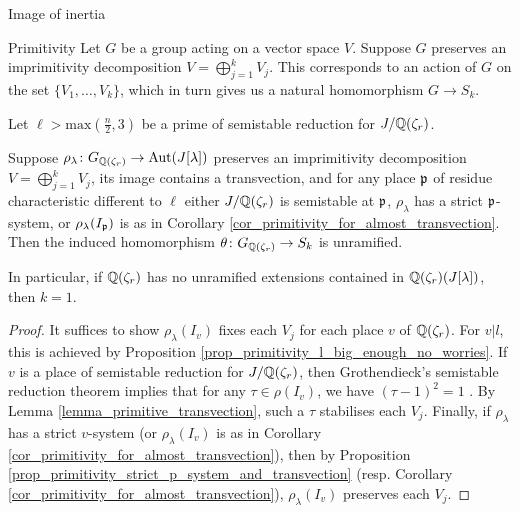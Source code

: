 \documentclass[11pt,a4paper]{article}
\newcommand{\Qr}{{\QQ(\zeta_r)}}
\newcommand{\GQr}{G_{\QQ(\zeta_{r})}}
\begin{document}
\begin{section}{Image of inertia}
\begin{subsection}{Primitivity}
Let $G$ be a group acting on a vector space $V$. Suppose $G$ preserves an imprimitivity decomposition $V = \bigoplus_{j=1}^kV_j$. This corresponds to an action of $G$ on the set $\{V_1, \ldots , V_k\}$, which in turn gives us a natural homomorphism $G\rightarrow S_k$.

\begin{lemma}
\label{lemma_primitivity_p-systems_imply_primtive_when_no_unramified_extensions}
 Let $\ell> \mathrm{max}(\frac{n}{2},3)$ be a prime of semistable reduction for $J/\Qr$.
 
Suppose $\rho_\lambda\colon \GQr \rightarrow \Aut(J[\lambda])$ preserves an imprimitivity decomposition $V=\bigoplus^{k}_{j=1}V_j$, its image contains a transvection, and for any place $\mathfrak{p}$ of residue characteristic different to $\ell$ either $J/\Qr$ is semistable at $\mathfrak{p}$, $\rho_\lambda$ has a strict $\mathfrak{p}$-system, or $\rho_\lambda(I_{\mathfrak{p}})$ is as in Corollary \ref{cor_primitivity_for_almost_transvection}. Then the induced homomorphism $\theta\colon \GQr \rightarrow S_k$ is unramified.
 
 In particular, if $\Qr$ has no unramified extensions contained in $\Qr(J[\lambda])$, then $k=1$.
\end{lemma}

\begin{proof}
It suffices to show $\rho_\lambda(I_v)$ fixes each $V_j$ for each place $v$ of $\Qr$.
For $v|l$, this is achieved by Proposition \ref{prop_primitivity_l_big_enough_no_worries}.
If $v$ is a place of semistable reduction for $J/\Qr$, then Grothendieck's semistable reduction theorem implies that for any $\tau \in \rho(I_v)$, we have $(\tau-1)^2=1$ \cite[Proposition 3.5]{SGA7} \cite[Page 184, Thm 6]{Neron_models_BLR_book}. By Lemma \ref{lemma_primitive_transvection}, such a $\tau$ stabilises each $V_j$.
Finally, if $\rho_\lambda$ has a strict $v$-system (or $\rho_\lambda(I_v)$ is as in Corollary \ref{cor_primitivity_for_almost_transvection}), then by Proposition \ref{prop_primitivity_strict_p_system_and_transvection} (resp. Corollary \ref{cor_primitivity_for_almost_transvection}), $\rho_\lambda(I_v)$ preserves each $V_j$.
\end{proof}


\end{subsection}
\end{section}
\end{document}
